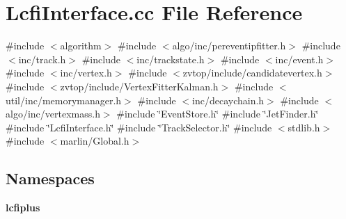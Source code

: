 \section{Lcfi\+Interface.\+cc File Reference}
\label{LcfiInterface_8cc}
{\ttfamily \#include $<$algorithm$>$}\newline
{\ttfamily \#include $<$algo/inc/pereventipfitter.\+h$>$}\newline
{\ttfamily \#include $<$inc/track.\+h$>$}\newline
{\ttfamily \#include $<$inc/trackstate.\+h$>$}\newline
{\ttfamily \#include $<$inc/event.\+h$>$}\newline
{\ttfamily \#include $<$inc/vertex.\+h$>$}\newline
{\ttfamily \#include $<$zvtop/include/candidatevertex.\+h$>$}\newline
{\ttfamily \#include $<$zvtop/include/\+Vertex\+Fitter\+Kalman.\+h$>$}\newline
{\ttfamily \#include $<$util/inc/memorymanager.\+h$>$}\newline
{\ttfamily \#include $<$inc/decaychain.\+h$>$}\newline
{\ttfamily \#include $<$algo/inc/vertexmass.\+h$>$}\newline
{\ttfamily \#include \char`\"{}Event\+Store.\+h\char`\"{}}\newline
{\ttfamily \#include \char`\"{}Jet\+Finder.\+h\char`\"{}}\newline
{\ttfamily \#include \char`\"{}Lcfi\+Interface.\+h\char`\"{}}\newline
{\ttfamily \#include \char`\"{}Track\+Selector.\+h\char`\"{}}\newline
{\ttfamily \#include $<$stdlib.\+h$>$}\newline
{\ttfamily \#include $<$marlin/\+Global.\+h$>$}\newline
\subsection*{Namespaces}
\begin{DoxyCompactItemize}
\item 
 \textbf{ lcfiplus}
\end{DoxyCompactItemize}
